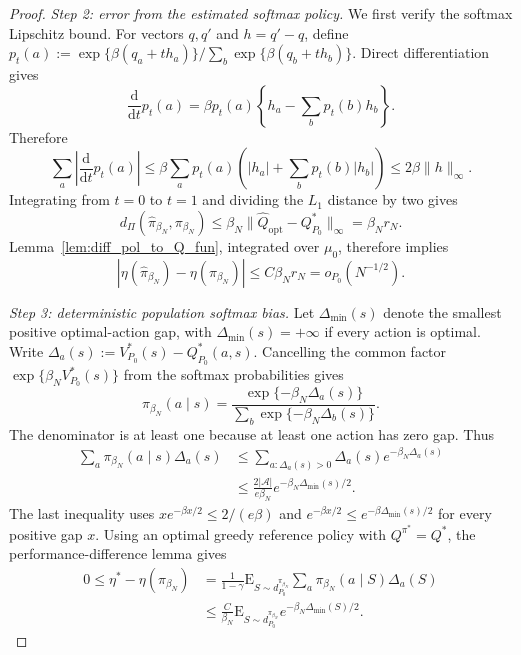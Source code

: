 \documentclass[12pt]{article}
\theoremstyle{remark}\newtheorem{remark}[theorem]{Remark}\theoremstyle{plain}
\newcommand{\E}{\mathrm{E}}
\begin{document}
\begin{proof}
    \emph{Step 2: error from the estimated softmax policy.}
    We first verify the softmax Lipschitz bound.  For vectors $q,q'$
    and $h=q'-q$, define
    $p_t(a):=\exp\{\beta(q_a+th_a)\}/
      \sum_b\exp\{\beta(q_b+th_b)\}$.  Direct differentiation gives
    \[
        \frac{\mathrm d}{\mathrm dt}p_t(a)
        =
        \beta p_t(a)
        \left\{h_a-\sum_bp_t(b)h_b\right\}.
    \]
    Therefore
    \[
        \sum_a\left|
        \frac{\mathrm d}{\mathrm dt}p_t(a)\right|
        \leq
        \beta\sum_ap_t(a)
        \left(|h_a|+\sum_bp_t(b)|h_b|\right)
        \leq2\beta\|h\|_\infty.
    \]
    Integrating from $t=0$ to $t=1$ and dividing the $L_1$ distance
    by two gives
    \[
        d_\Pi(\widehat\pi_{\beta_N},\pi_{\beta_N})
        \leq
        \beta_N
        \|\widehat Q_{\mathrm{opt}}-Q_{P_0}^*\|_\infty
        =\beta_N r_N.
    \]
    Lemma~\ref{lem:diff_pol_to_Q_fun}, integrated over $\mu_0$,
    therefore implies
    \[
        |\eta(\widehat\pi_{\beta_N})-\eta(\pi_{\beta_N})|
        \leq C\beta_Nr_N=o_{P_0}(N^{-1/2}).
    \]

    \emph{Step 3: deterministic population softmax bias.}
    Let $\Delta_{\min}(s)$ denote the smallest positive
    optimal-action gap, with $\Delta_{\min}(s)=+\infty$ if every
    action is optimal.  Write
    $\Delta_a(s):=V_{P_0}^*(s)-Q_{P_0}^*(a,s)$.  Cancelling the common
    factor $\exp\{\beta_N V_{P_0}^*(s)\}$ from the softmax
    probabilities gives
    \[
        \pi_{\beta_N}(a\mid s)
        =
        \frac{\exp\{-\beta_N\Delta_a(s)\}}
        {\sum_b\exp\{-\beta_N\Delta_b(s)\}}.
    \]
    The denominator is at least one because at least one action has
    zero gap.  Thus
    \[
        \begin{aligned}
        \sum_a\pi_{\beta_N}(a\mid s)
        \Delta_a(s)
        &\leq
        \sum_{a:\Delta_a(s)>0}
        \Delta_a(s)e^{-\beta_N\Delta_a(s)}\\
        &\leq
        \frac{2|\mathcal A|}{e\beta_N}
        e^{-\beta_N\Delta_{\min}(s)/2}.
        \end{aligned}
    \]
    The last inequality uses
    $xe^{-\beta x/2}\leq2/(e\beta)$ and
    $e^{-\beta x/2}\leq
      e^{-\beta\Delta_{\min}(s)/2}$ for every positive gap $x$.
    Using an optimal greedy reference policy with
    $Q^{\pi^*}=Q^*$, the performance-difference lemma gives
    \[
        \begin{aligned}
        0\leq\eta^*-\eta(\pi_{\beta_N})
        &=
        \frac1{1-\gamma}
        \E_{S\sim d_{P_0}^{\pi_{\beta_N}}}
        \sum_a\pi_{\beta_N}(a\mid S)\Delta_a(S)\\
        &\leq
        \frac{C}{\beta_N}
        \E_{S\sim d_{P_0}^{\pi_{\beta_N}}}
        e^{-\beta_N\Delta_{\min}(S)/2}.
        \end{aligned}
    \]


\end{proof}
\end{document}
